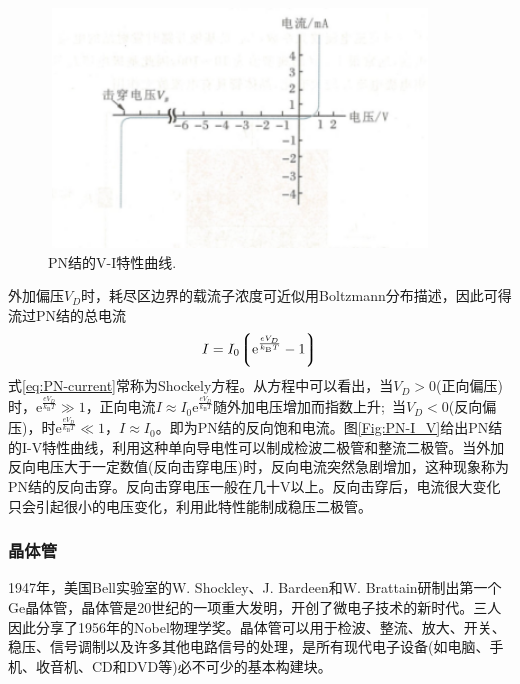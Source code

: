 \begin{figure}[h!]
\centering
\vspace*{-0.10in}
\includegraphics[height=2.50in,width=4.00in,viewport=0 0 80 50,clip]{Figures/P-N_I-V.png}
\caption{\small \textrm{PN结的V-I特性曲线.}}%
\label{Fig:PN_I-V}
\end{figure} 
外加偏压$V_D$时，耗尽区边界的载流子浓度可近似用Boltzmann分布描述，因此可得流过PN结的总电流
\begin{equation}
	I=I_0\bigg\lgroup\mathrm{e}^{\frac{eV_D}{k_{\mathrm{B}}T}}-1\bigg\rgroup
	\label{eq:PN-current}
\end{equation}
式\eqref{eq:PN-current}常称为Shockely方程。从方程中可以看出，当$V_D>0$(正向偏压)时，$\mathrm{e}^{\frac{eV_D}{k_{\mathrm{B}}T}}\gg1$，正向电流$I\approx I_0\mathrm{e}^{\frac{eV_D}{k_{\mathrm{B}}T}}$随外加电压增加而指数上升;~当$V_D<0$(反向偏压)，时$\mathrm{e}^{\frac{eV_D}{k_{\mathrm{B}}T}}\ll1$，$I\approx I_0$。即为PN结的反向饱和电流。图\ref{Fig:PN-I_V}给出PN结的I-V特性曲线，利用这种单向导电性可以制成检波二极管和整流二极管。当外加反向电压大于一定数值(反向击穿电压)时，反向电流突然急剧增加，这种现象称为PN结的反向击穿。反向击穿电压一般在几十V以上。反向击穿后，电流很大变化只会引起很小的电压变化，利用此特性能制成稳压二极管。 

\subsubsection{晶体管} 
1947年，美国Bell实验室的W. Shockley、J. Bardeen和W. Brattain研制出第一个Ge晶体管，晶体管是20世纪的一项重大发明，开创了微电子技术的新时代。三人因此分享了1956年的Nobel物理学奖。晶体管可以用于检波、整流、放大、开关、稳压、信号调制以及许多其他电路信号的处理，是所有现代电子设备(如电脑、手机、收音机、CD和DVD等)必不可少的基本构建块。

